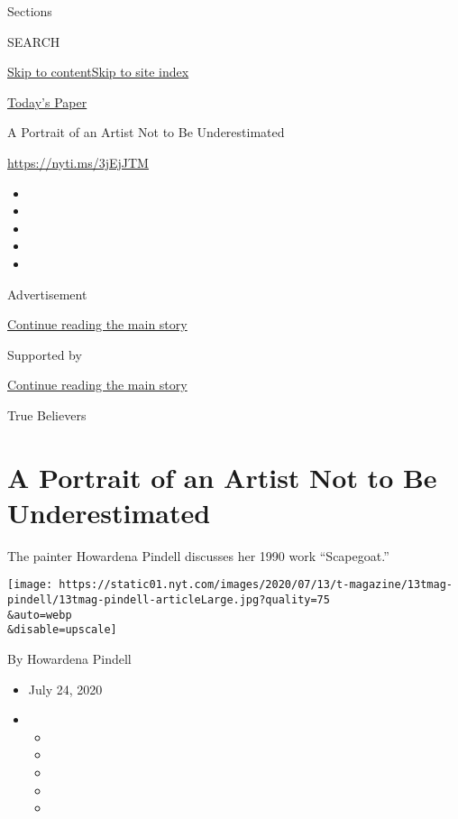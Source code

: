 Sections

SEARCH

\protect\hyperlink{site-content}{Skip to
content}\protect\hyperlink{site-index}{Skip to site index}

\href{https://myaccount.nytimes.com/auth/login?response_type=cookie\&client_id=vi}{}

\href{https://www.nytimes.com/section/todayspaper}{Today's Paper}

A Portrait of an Artist Not to Be Underestimated

\url{https://nyti.ms/3jEjJTM}

\begin{itemize}
\item
\item
\item
\item
\item
\end{itemize}

Advertisement

\protect\hyperlink{after-top}{Continue reading the main story}

Supported by

\protect\hyperlink{after-sponsor}{Continue reading the main story}

True Believers

\hypertarget{a-portrait-of-an-artist-not-to-be-underestimated}{%
\section{A Portrait of an Artist Not to Be
Underestimated}\label{a-portrait-of-an-artist-not-to-be-underestimated}}

The painter Howardena Pindell discusses her 1990 work ``Scapegoat.''

\texttt{[image: https://static01.nyt.com/images/2020/07/13/t-magazine/13tmag-pindell/13tmag-pindell-articleLarge.jpg?quality=75\\\&auto=webp\\\&disable=upscale]}

By Howardena Pindell

\begin{itemize}
\item
  July 24, 2020
\item
  \begin{itemize}
  \item
  \item
  \item
  \item
  \item
  \end{itemize}
\end{itemize}

